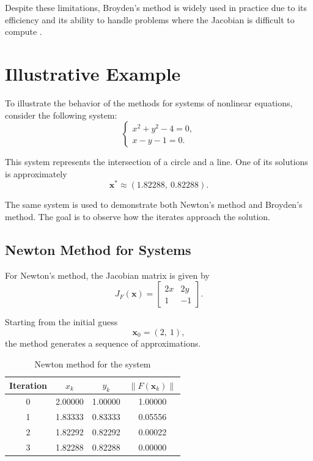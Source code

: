 Despite these limitations, Broyden's method is widely used in practice due to its efficiency and its ability to handle problems where the Jacobian is difficult to compute \cite{kelley}.

\section{Illustrative Example}

To illustrate the behavior of the methods for systems of nonlinear equations, consider the following system:
\begin{equation}
\begin{cases}
x^2 + y^2 - 4 = 0, \\
x - y - 1 = 0.
\end{cases}
\end{equation}

This system represents the intersection of a circle and a line. One of its solutions is approximately
\[
\mathbf{x}^* \approx (1.82288,\ 0.82288).
\]

The same system is used to demonstrate both Newton's method and Broyden's method. The goal is to observe how the iterates approach the solution.

\subsection{Newton Method for Systems}

For Newton's method, the Jacobian matrix is given by
\begin{equation}
J_F(\mathbf{x}) =
\begin{bmatrix}
2x & 2y \\
1 & -1
\end{bmatrix}.
\end{equation}

Starting from the initial guess
\[
\mathbf{x}_0 = (2,\ 1),
\]
the method generates a sequence of approximations.

\begin{table}[h!]
\centering
\caption{Newton method for the system}
\label{tab:newton_system_example}
\begin{tabular}{|c|c|c|c|}
\hline
Iteration & \(x_k\) & \(y_k\) & \(\|F(\mathbf{x}_k)\|\) \\ \hline
0 & 2.00000 & 1.00000 & 1.00000 \\ \hline
1 & 1.83333 & 0.83333 & 0.05556 \\ \hline
2 & 1.82292 & 0.82292 & 0.00022 \\ \hline
3 & 1.82288 & 0.82288 & 0.00000 \\ \hline
\end{tabular}
\end{table}

